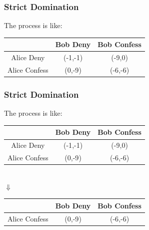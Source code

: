 \documentclass{beamer}
\begin{document}
\begin{frame}
\frametitle{Strict Domination}
The process is like:\\
\centering
\begin{tabular}{|c|c|c|}
\hline
\hline
    &{\color{red}Bob} Deny&{\color{red}Bob} Confess\\
\hline
{\color{blue}Alice} Deny& ({\color{blue}-1},{\color{red}-1}) & ({\color{blue}-9},{\color{red}0})\\
\hline
{\color{blue}Alice} Confess& ({\color{blue}0},{\color{red}-9}) & ({\color{blue}-6},{\color{red}-6})\\
\hline
\hline
\end{tabular}
\end{frame}

\begin{frame}
\frametitle{Strict Domination}
The process is like:\\
\centering
\begin{tabular}{|c|c|c|}
\hline
\hline
    &{\color{red}Bob} Deny&{\color{red}Bob} Confess\\
\hline
{\color{blue}Alice} Deny& ({\color{blue}-1},{\color{red}-1}) & ({\color{blue}-9},{\color{red}0})\\
\hline
{\color{blue}Alice} Confess& ({\color{blue}0},{\color{red}-9}) & ({\color{blue}-6},{\color{red}-6})\\
\hline
\hline
\end{tabular}\\
$\Downarrow$\\
\begin{tabular}{|c|c|c|}
\hline
\hline
    &{\color{red}Bob} Deny&{\color{red}Bob} Confess\\
\hline
{\color{blue}Alice} Confess& ({\color{blue}0},{\color{red}-9}) & ({\color{blue}-6},{\color{red}-6})\\
\hline
\hline
\end{tabular}
\end{frame}
\end{document}
